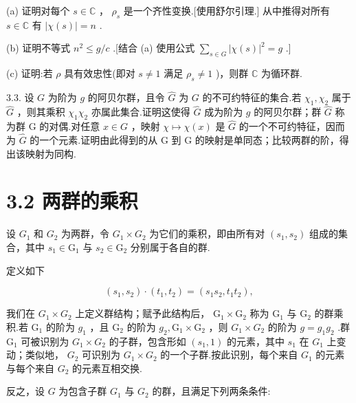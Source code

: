 \documentclass[10pt]{article}
\begin{document}
(a) 证明对每个 \(s \in  \mathbb{C}\) ， \({\rho }_{s}\) 是一个齐性变换.[使用舒尔引理.] 从中推得对所有 \(s \in  \mathbb{C}\) 有 \(\left| {\chi \left( s\right) }\right|  = n\) .

(b) 证明不等式 \({n}^{2} \leq  g/c\) .[结合 (a) 使用公式 \(\mathop{\sum }\limits_{{s \in  G}}{\left| \chi \left( s\right) \right| }^{2} = g\) .]

(c) 证明:若 \(\rho\) 具有效忠性(即对 \(s \neq  1\) 满足 \({\rho }_{s} \neq  1\) )，则群 \(\mathbb{C}\) 为循环群.

3.3. 设 \(G\) 为阶为 \(g\) 的阿贝尔群，且令 \(\widehat{G}\) 为 \(G\) 的不可约特征的集合.若 \({\chi }_{1},{\chi }_{2}\) 属于 \(\widehat{G}\) ，则其乘积 \({\chi }_{1}{\chi }_{2}\) 亦属此集合.证明这使得 \(\widehat{G}\) 成为阶为 \(g\) 的阿贝尔群；群 \(\widehat{G}\) 称为群 G 的对偶.对任意 \(x \in  G\) ，映射 \(\chi  \mapsto  \chi \left( x\right)\) 是 \(\widehat{G}\) 的一个不可约特征，因而为 \(\widehat{G}\) 的一个元素.证明由此得到的从 G 到 G 的映射是单同态；比较两群的阶，得出该映射为同构.

\section*{3.2 两群的乘积}

设 \({G}_{1}\) 和 \({G}_{2}\) 为两群，令 \({G}_{1} \times  {G}_{2}\) 为它们的乘积，即由所有对 \(\left( {{s}_{1},{s}_{2}}\right)\) 组成的集合，其中 \({s}_{1} \in  {\mathrm{G}}_{1}\) 与 \({s}_{2} \in  {\mathrm{G}}_{2}\) 分别属于各自的群.

定义如下

\[
\left( {{s}_{1},{s}_{2}}\right)  \cdot  \left( {{t}_{1},{t}_{2}}\right)  = \left( {{s}_{1}{s}_{2},{t}_{1}{t}_{2}}\right) ,
\]

我们在 \({G}_{1} \times  {G}_{2}\) 上定义群结构；赋予此结构后， \({\mathrm{G}}_{1} \times  {\mathrm{G}}_{2}\) 称为 \({\mathrm{G}}_{1}\) 与 \({\mathrm{G}}_{2}\) 的群乘积.若 \({\mathrm{G}}_{1}\) 的阶为 \({g}_{1}\) ，且 \({\mathrm{G}}_{2}\) 的阶为 \({g}_{2},{\mathrm{G}}_{1} \times  {\mathrm{G}}_{2}\) ，则 \({G}_{1} \times  {G}_{2}\) 的阶为 \(g = {g}_{1}{g}_{2}\) .群 \({\mathrm{G}}_{1}\) 可被识别为 \({G}_{1} \times  {G}_{2}\) 的子群，包含形如 \(\left( {{s}_{1},1}\right)\) 的元素，其中 \({s}_{1}\) 在 \({G}_{1}\) 上变动；类似地， \({G}_{2}\) 可识别为 \({G}_{1} \times  {G}_{2}\) 的一个子群.按此识别，每个来自 \({G}_{1}\) 的元素与每个来自 \({G}_{2}\) 的元素互相交换.

反之，设 \(G\) 为包含子群 \({G}_{1}\) 与 \({G}_{2}\) 的群，且满足下列两条条件:
\end{document}

